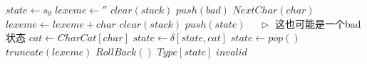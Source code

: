 \documentclass[varwidth=\maxdimen]{standalone}
\newcommand{\LeftComment}[1]{$\quad\triangleright$ #1}
\begin{document}
\begin{algorithmic}[1]
  \State $state \gets s_0$
  \State $lexeme \gets ''$
  \State $clear(stack)$
  \State $push(bad)$
    \State $NextChar(char)$
    \State $lexeme \gets lexeme+char$
      \State $clear(stack)$
    \EndIf
    \State $push(state)$ \LeftComment{这也可能是一个bad状态}
    \State $cat \gets CharCat[char]$
    \State $state \gets \delta[state,cat]$
  \EndWhile
    \State $state \gets pop()$
    \State $truncate(lexeme)$
    \State $RollBack()$
  \EndWhile
    \StateReturn $Type[state]$
  \Else
    \StateReturn $invalid$
  \EndIf
  \EndProcedure
\end{algorithmic}
\end{document}
